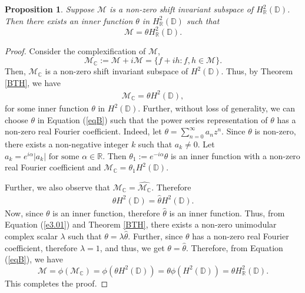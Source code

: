 \documentclass[11pt]{amsart}
\newtheorem{proposition}[theorem]{Proposition}
\numberwithin{equation}{section}
\begin{document}
\begin{proposition}\label{prop1}
Suppose $\mathcal{M}$ is a non-zero shift invariant subspace of $H^2_\mathbb{R}(\mathbb{D})$. Then there exists an inner function $\theta$ in $H^2_\mathbb{R}(\mathbb{D})$ such that $$\mathcal{M}=\theta H^2_\mathbb{R}(\mathbb{D}).$$
\end{proposition}
\begin{proof}
Consider the complexification of $\mathcal{M}$, $$\mathcal{M}_\mathbb{C}:=\mathcal{M}+i\mathcal{M}=\{f+ih : f,h \in \mathcal{M}\}.$$
Then, $\mathcal{M}_\mathbb{C}$ is a non-zero shift invariant subspace of $H^2(\mathbb{D})$. Thus, by Theorem \ref{BTH}, we have
\begin{eqnarray} \label{eqB}
\mathcal{M}_\mathbb{C}=\theta H^2(\mathbb{D}),   \end{eqnarray}
for some inner function $\theta$ in $H^2(\mathbb{D})$. Further, without loss of generality, we can choose $\theta$ in Equation (\ref{eqB}) such that the power series representation of $\theta$ has a non-zero real Fourier coefficient. Indeed, let $\theta=\sum_{n=0}^{\infty}a_nz^n$. Since $\theta$ is non-zero, there exists a non-negative integer $k$ such that $a_k\ne 0$. Let $a_k=e^{i\alpha}|a_k| \text{ for some } \alpha \in \mathbb{R}$. Then $\theta_1:=e^{-i\alpha}\theta$ is an inner function with a non-zero real Fourier coefficient and $\mathcal{M}_\mathbb{C}=\theta_1 H^2(\mathbb{D})$.
 
 Further, we also observe that $\mathcal{M}_\mathbb{C}=\widehat{\mathcal{M}_\mathbb{C}}$. Therefore 
\begin{eqnarray}\label{e3.01}
\theta H^2(\mathbb{D})=\widehat{\theta} H^2(\mathbb{D}).
\end{eqnarray}
Now, since $\theta$ is an inner function, therefore $\widehat{\theta}$ is an inner function. Thus, from Equation (\ref{e3.01}) and Theorem \ref{BTH}, there exists a non-zero unimodular complex scalar $\lambda$ such that $\theta=\lambda \widehat{\theta}$. Further, since $\theta$ has a non-zero real Fourier coefficient, therefore $\lambda=1$, and thus, we get $\theta=\widehat{\theta}$.
Therefore, from Equation (\ref{eqB}), we have 
$$\mathcal{M}=\phi(\mathcal{M}_\mathbb{C})=\phi(\theta H^2(\mathbb{D}))=\theta \phi(H^2(\mathbb{D}))=\theta H^2_\mathbb{R}(\mathbb{D}).$$
This completes the proof.
\end{proof}
\end{document}
